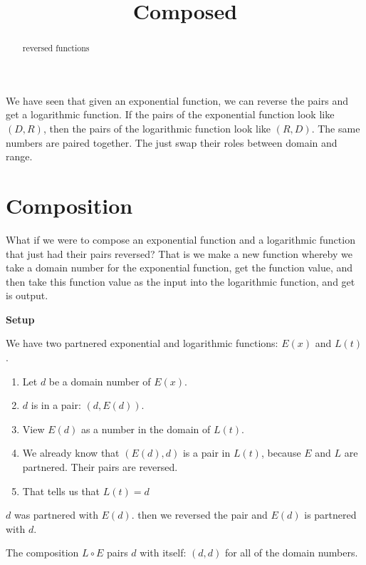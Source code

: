 \documentclass{ximera}
\title{Composed}
\begin{document}
\begin{abstract}
reversed functions
\end{abstract}
\maketitle







We have seen that given an exponential function, we can reverse the pairs and get a logarithmic function.  If the pairs of the exponential function look like $(D,R)$, then the pairs of the logarithmic function look like $(R,D)$.  The same numbers are paired together.  The just swap their roles between domain and range.

\section*{Composition}

What if we were to compose an exponential function and a logarithmic function that just had their pairs reversed?  That is we make a new function whereby we take a domain number for the exponential function, get the function value, and then take this function value as the input into the logarithmic function, and get is output. 





\textbf{Setup}

We have two partnered exponential and logarithmic functions: $E(x)$ and $L(t)$.  

\begin{enumerate}
\item Let $d$ be a domain number of $E(x)$.
\item $d$ is in a pair: $(d, E(d))$.
\item View $E(d)$ as a number in the domain of $L(t)$.
\item We already know that $(E(d),d)$ is a pair in $L(t)$, because $E$ and $L$ are partnered.  Their pairs are reversed.
\item That tells us that $L(t)=d$
\end{enumerate}



$d$ was partnered with $E(d)$.  then we reversed the pair and $E(d)$ is partnered with $d$.

The composition $L \circ E$ pairs $d$ with itself: $(d,d)$ for all of the domain numbers. 
\end{document}
